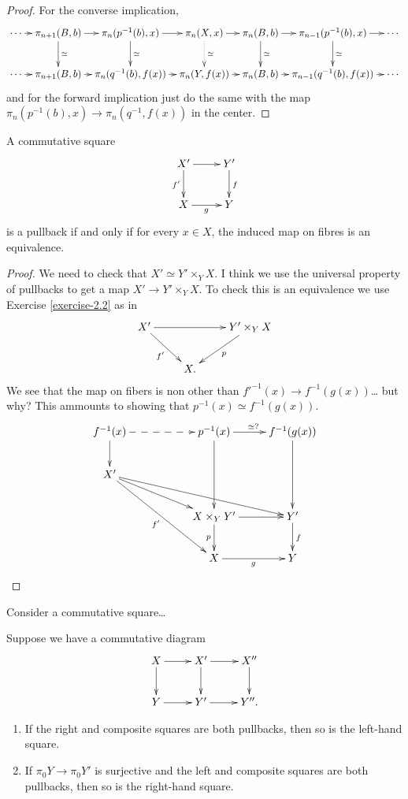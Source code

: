 \begin{proof}
For the converse implication,
$$
\xymatrix@C=.7em{
\cdots
\ar[r]&\pi_{n+1}(B,b)\ar[r]\ar[d]^{\simeq}
&\pi_n(p^{-1}(b),x)\ar[r]\ar[d]^{\simeq}
&\pi_n(X,x)\ar[r]\ar@{.>}[d]^{\simeq }
&\pi_n(B,b)\ar[r]\ar[d]^{\simeq}
&\pi_{n-1}(p^{-1}(b),x)\ar[d]^{\simeq}\ar[r]
&\cdots\\
\cdots\ar[r]
&\pi_{n+1}(B,b)\ar[r]
&\pi_n(q^{-1}(b),f(x))\ar[r]
&\pi_n(Y,f(x))\ar[r]
&\pi_n(B,b)\ar[r]
&\pi_{n-1}(q^{-1}(b),f(x))\ar[r]
&\cdots
}
$$
and for the forward implication just do the
same with
the map $\pi_n(p^{-1}(b),x)\to
\pi_n(q^{-1},f(x))$ in the center.
\end{proof}

\begin{lemma}
\label{lemma-pullb-iff-fiber-maps-equiv}
A commutative square
$$
\xymatrix{
X'\ar[r]\ar[d]_{f'}&Y'\ar[d]^{f}\\
X\ar[r]_{g}&Y
}
$$
is a pullback if and only if for every $x \in
X$,
the induced map on fibres is an equivalence.
\end{lemma}

\begin{proof}
We need to check that $X' \simeq Y'\times_Y
X$.
I think we use the universal property of
pullbacks
to get a map $X' \to Y'\times_YX$.
To check this is an equivalence we use
Exercise \ref{exercise-2.2} as in
$$
\xymatrix{
X' \ar[rd]_{f'} \ar[rr] && Y'\times_YX
\ar[dl]^p \\
& X.
}
$$
We see that the map on fibers is non other
than $f'^{-1}(x) \to f^{-1}(g(x))$… but why?
This ammounts to showing that
$p^{-1}(x)\simeq f^{-1}(g(x))$.
$$
\xymatrix{
f^{-1}(x)\ar[d]\ar@{-->}[rr]
& & p^{-1}(x)\ar[dd]\ar[r]^{\simeq?}
&f^{-1}(g(x))\ar[dd]\\
X' \ar[rrrd] \ar[rrd] \ar[rrdd]_{f'} & & \\
& & X \times_YY' \ar[d]_p \ar[r] & Y'
\ar[d]^f \\
& & X \ar[r]_g & Y
}
$$
\end{proof}

\begin{exercise}[2.3]
\label{exercise-2.3}
Consider a commutative square…

\end{exercise}

\begin{exercise}[2.4]
\label{exercise-2.4}
Suppose we have a commutative diagram
$$
\xymatrix{
X\ar[r]\ar[d]&X'\ar[d]\ar[r]& X''\ar[d]\\
Y\ar[r]&Y'\ar[r]&Y''.
}
$$
\begin{enumerate}
\item If the right and composite squares are
both pullbacks,
then so is the left-hand square.
\item If $\pi_0Y \to \pi_0Y'$ is surjective
and the left and composite squares
are both pullbacks,
then so is the right-hand square.
\end{enumerate}
\end{exercise}

